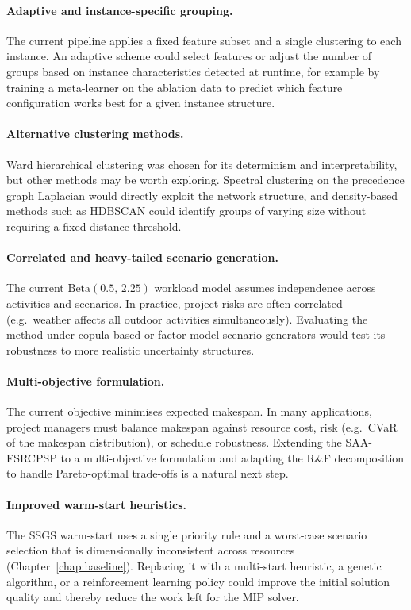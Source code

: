 \paragraph{Adaptive and instance-specific grouping.}
The current pipeline applies a fixed feature subset and a
single clustering to each instance. An adaptive scheme could
select features or adjust the number of groups based on
instance characteristics detected at runtime, for example by
training a meta-learner on the ablation data to predict which
feature configuration works best for a given instance structure.

\paragraph{Alternative clustering methods.}
Ward hierarchical clustering was chosen for its determinism and
interpretability, but other methods may be worth exploring.
Spectral clustering on the precedence graph Laplacian would
directly exploit the network structure, and density-based
methods such as HDBSCAN could identify groups of varying size
without requiring a fixed distance threshold.

\paragraph{Correlated and heavy-tailed scenario generation.}
The current $\mathrm{Beta}(0.5,\,2.25)$ workload model assumes
independence across activities and scenarios. In practice,
project risks are often correlated (e.g.\ weather affects all
outdoor activities simultaneously). Evaluating the method under
copula-based or factor-model scenario generators would test its
robustness to more realistic uncertainty structures.

\paragraph{Multi-objective formulation.}
The current objective minimises expected makespan. In many
applications, project managers must balance makespan against
resource cost, risk (e.g.\ CVaR of the makespan distribution),
or schedule robustness. Extending the SAA-FSRCPSP to a
multi-objective formulation and adapting the R\&F decomposition
to handle Pareto-optimal trade-offs is a natural next step.

\paragraph{Improved warm-start heuristics.}
The SSGS warm-start uses a single priority rule and a
worst-case scenario selection that is dimensionally
inconsistent across resources
(Chapter~\ref{chap:baseline}). Replacing it with a
multi-start heuristic, a genetic algorithm, or a reinforcement
learning policy could improve the initial solution quality and
thereby reduce the work left for the MIP solver.

